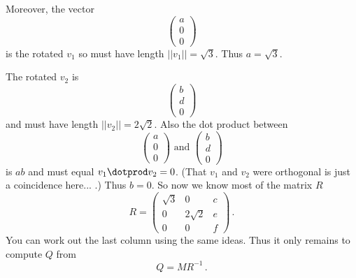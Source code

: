 {Moreover, the vector 
\[
\begin{pmatrix}
a \\ 0 \\ 0
\end{pmatrix}
\]
is the rotated $v_1$ so must have length $||v_1|| = \sqrt{3}$. Thus $a= \sqrt{3}$. 

The rotated $v_2$ is
\[
\begin{pmatrix}
b \\ d \\ 0
\end{pmatrix}
\]
and must have length $||v_2||=2\sqrt{2}$. Also the dot product between  
\[
\begin{pmatrix}
a \\ 0 \\ 0
\end{pmatrix}
\mbox{ and }
\begin{pmatrix}
b \\ d \\ 0
\end{pmatrix}
\]
is $ab$ and
must equal $v_1\dotprod v_2=0$. (That $v_1$ and $v_2$ were orthogonal is just a coincidence here... .) Thus $b=0$.
So now we know most of the matrix $R$
\[
R=\begin{pmatrix}\sqrt{3} & 0 & c \\ 0 & 2\sqrt{2} & e \\ 0  & 0 & f\end{pmatrix}\, .
\]
You can work out the last column using the same ideas. Thus it only remains to compute $Q$ from
\[
Q=M R^{-1}\, .
\]

 
}

